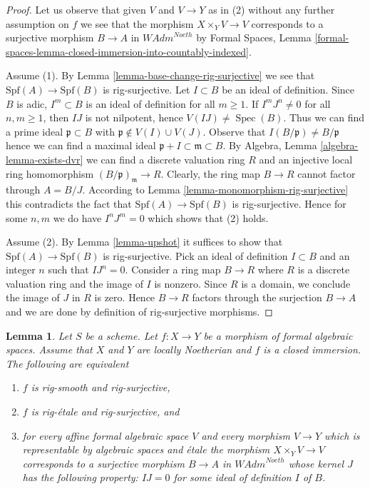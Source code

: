 \documentclass{stacks-project}
\theoremstyle{plain}
\newtheorem{lemma}[subsection]{Lemma}
\theoremstyle{definition}
\theoremstyle{remark}
\numberwithin{equation}{subsection}
\def\Spec{\mathop{\mathrm{Spec}}}
\begin{document}
\begin{proof}
Let us observe that given $V$ and $V \to Y$ as in (2) without any
further assumption on $f$ we see that the morphism $X \times_Y V \to V$
corresponds to a surjective morphism $B \to A$ in $\textit{WAdm}^{Noeth}$
by Formal Spaces, Lemma
\ref{formal-spaces-lemma-closed-immersion-into-countably-indexed}.

\medskip\noindent
Assume (1). By Lemma \ref{lemma-base-change-rig-surjective} we see that
$\text{Spf}(A) \to \text{Spf}(B)$ is rig-surjective.
Let $I \subset B$ be an ideal of definition. Since $B$ is adic,
$I^m \subset B$ is an ideal of definition for all $m \geq 1$.
If $I^m J^n \not = 0$ for all $n, m \geq 1$, then
$IJ$ is not nilpotent, hence $V(IJ) \not = \Spec(B)$.
Thus we can find a prime ideal $\mathfrak p \subset B$
with $\mathfrak p \not \in V(I) \cup V(J)$.
Observe that $I(B/\mathfrak p) \not = B/\mathfrak p$
hence we can find a maximal ideal
$\mathfrak p + I \subset \mathfrak m \subset B$.
By Algebra, Lemma \ref{algebra-lemma-exists-dvr}
we can find a discrete valuation ring $R$
and an injective local ring homomorphism $(B/\mathfrak p)_\mathfrak m \to R$.
Clearly, the ring map $B \to R$ cannot factor through $A = B/J$.
According to Lemma \ref{lemma-monomorphism-rig-surjective}
this contradicts the fact that $\text{Spf}(A) \to \text{Spf}(B)$
is rig-surjective. Hence for some $n, m$ we do have
$I^n J^m = 0$ which shows that (2) holds.

\medskip\noindent
Assume (2). By Lemma \ref{lemma-upshot} it suffices to show
that $\text{Spf}(A) \to \text{Spf}(B)$ is rig-surjective.
Pick an ideal of definition $I \subset B$ and an integer $n$
such that $I J^n = 0$.
Consider a ring map $B \to R$ where $R$ is a discrete valuation
ring and the image of $I$ is nonzero. Since $R$ is a domain, we
conclude the image of $J$ in $R$ is zero. Hence $B \to R$
factors through the surjection $B \to A$ and we are done by
definition of rig-surjective morphisms.
\end{proof}

\begin{lemma}
\label{lemma-closed-immersion-rig-smooth-rig-surjective}
Let $S$ be a scheme. Let $f : X \to Y$ be a morphism of formal algebraic
spaces. Assume that $X$ and $Y$ are locally Noetherian and $f$ is a
closed immersion. The following are equivalent
\begin{enumerate}
\item $f$ is rig-smooth and rig-surjective,
\item $f$ is rig-\'etale and rig-surjective, and
\item for every affine formal algebraic space $V$ and every morphism
$V \to Y$ which is representable by algebraic spaces and \'etale
the morphism $X \times_Y V \to V$ corresponds to a surjective morphism
$B \to A$ in $\textit{WAdm}^{Noeth}$ whose kernel $J$ has the following
property: $IJ = 0$ for some ideal of definition $I$ of $B$.
\end{enumerate}
\end{lemma}
\end{document}
